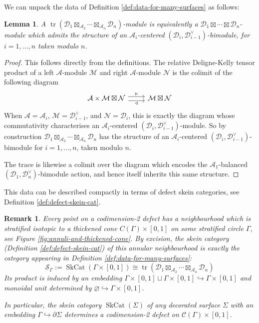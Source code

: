 \documentclass[a4paper]{article}
\numberwithin{equation}{section}
\newtheorem{lemma}[counter]{Lemma}
\newtheorem{remark}[counter]{Remark}
\newcommand{\1}{{\mathrm{1}\mkern-4mu{\mathchoice{}{}{\mskip-0.5mu}{\mskip-1mu}}\mathrm{l}}}
\newcommand{\A}{\mathcal{A}}
\newcommand{\C}{\mathcal{C}}
\newcommand{\D}{\mathcal{D}}
\DeclareMathOperator{\SkCat}{SkCat}
\DeclareMathOperator{\tr}{tr}
\begin{document}
We can unpack the data of Definition \ref{def:data-for-many-surfaces} as follows:
\begin{lemma}\label{lemma:unpacking-line-data}
    A $\tr(\D_1\boxtimes_{\A_2}\cdots\boxtimes_{\A_{n}}\D_n)$-module is equivalently a $\D_1\boxtimes\cdots\boxtimes \D_n$-module which admits the structure of an $\A_i$-centered $(\D_{i},\D_{i-1}^\vee)$-bimodule, for $i = 1,\ldots ,n$ taken modulo $n$.  
\end{lemma}
\begin{proof}
    This follows directly from the definitions.
The relative Deligne-Kelly tensor product of a left $\A$-module $\mathcal{M}$ and right $\A$-module $\mathcal{N}$ is the colimit of the following diagram 
\begin{equation}
    \begin{tikzcd}
      \A\times \mathcal{M} \boxtimes \mathcal{N} \ar[r,yshift=3pt,"\triangleright"] \ar[r,yshift=-3pt,"\triangleleft"']& \mathcal{M} \boxtimes \mathcal{N} 
    \end{tikzcd}
\end{equation}
When $\A=\A_i$, $\mathcal{M} = \D_{i-1}^\vee$, and $\mathcal{N}=\D_i$, this is exactly the diagram whose commutativity characterises an $\A_i$-centered $(\D_i,\D_{i-1}^\vee)$-module. So by construction $\D_1\boxtimes_{\A_2} \cdots \boxtimes_{\A_{n}} \D_n$ has the structure of an $\A_i$-centered $(\D_i,\D_{i-1}^\vee)$-bimodule for $i=1,\ldots,n$, taken modulo $n$.

  The trace is likewise a colimit over the diagram which encodes the $\A_1$-balanced $(\D_1,\D_n^\vee)$-bimodule action, and hence itself inherits this same structure.
  \end{proof}

  This data can be described compactly in terms of defect skein categories, see Definition \ref{def:defect-skein-cat}.

\begin{remark}\label{rem:skeiny-version-of-defect-data}
    Every point on a codimension-2 defect has a neighbourhood which is stratified isotopic to a thickened cone $C(\Gamma)\times[0,1]$ on some stratified circle $\Gamma$, see Figure \ref{fig:annuli-and-thickened-cone}.
By excision, the skein category (Definition \ref{def:defect-skein-cat}) of this annular neighbourhood is exactly the category appearing in Definition \ref{def:data-for-many-surfaces}:
\begin{equation}
    \mathcal{S}_\Gamma := \SkCat(\Gamma\times[0,1]) \cong \tr(\D_1\boxtimes_{\A_2}\cdots\boxtimes_{\A_{n}}\D_n)
\end{equation}
Its product is induced by an embedding $\Gamma \times [0,1] \sqcup \Gamma \times [0,1] \hookrightarrow \Gamma\times [0,1]$ and monoidal unit determined by $\varnothing \hookrightarrow \Gamma\times [0,1]$.

In particular, the skein category $\SkCat(\Sigma)$ of any decorated surface $\Sigma$ with an embedding $\Gamma \hookrightarrow \partial \Sigma$ determines a codimension-2 defect on $\C(\Gamma)\times[0,1]$.
\end{remark}
\end{document}
